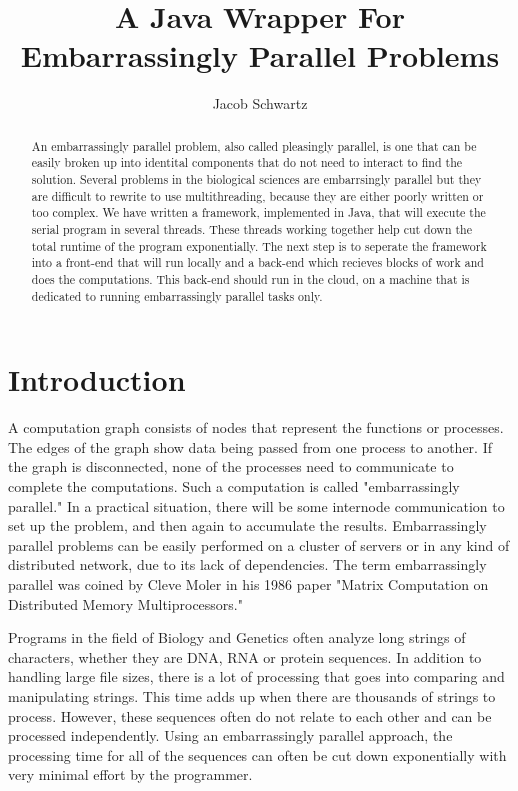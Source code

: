 \documentclass[12pt]{article}
\begin{document}
\title{A Java Wrapper For Embarrassingly Parallel Problems}
\author{Jacob Schwartz}
\maketitle

\begin{abstract}
An embarrassingly parallel problem, also called pleasingly parallel, is one that 
can be easily broken up into identital components that do not need to interact 
to find the solution. Several problems in the biological sciences are 
embarrsingly parallel but they are difficult to rewrite to use multithreading, 
because they are either poorly written or too complex. We have written a 
framework, implemented in Java, that will execute the serial program in several 
threads. These threads working together help cut down the total runtime of the
program exponentially. The next step is to seperate the framework into a 
front-end that will run locally and a back-end which recieves blocks of work and 
does the computations. This back-end should run in the cloud, on a machine that 
is dedicated to running embarrassingly parallel tasks only.
\end{abstract}

\section{Introduction}

A computation graph consists of nodes that represent the functions or processes. 
The edges of the graph show data being passed from one process to another. If 
the graph is disconnected, none of the processes need to communicate to complete
the computations. Such a computation is called "embarrassingly parallel." In a 
practical situation, there will be some internode communication to set up the 
problem, and then again to accumulate the results. Embarrassingly parallel 
problems can be easily performed on a cluster of servers or in any kind of 
distributed network, due to its lack of dependencies. The term embarrassingly 
parallel was coined by Cleve Moler in his 1986 paper "Matrix Computation on 
Distributed Memory Multiprocessors." \cite{history}

Programs in the field of Biology and Genetics often analyze long strings of
characters, whether they are DNA, RNA or protein sequences. In addition to
handling large file sizes, there is a lot of processing that goes into comparing
and manipulating strings. This time adds up when there are thousands of strings 
to process. However, these sequences often do not relate to each other and can 
be processed independently. Using an embarrassingly parallel approach, the 
processing time for all of the sequences can often be cut down exponentially 
with very minimal effort by the programmer.
\end{document}
